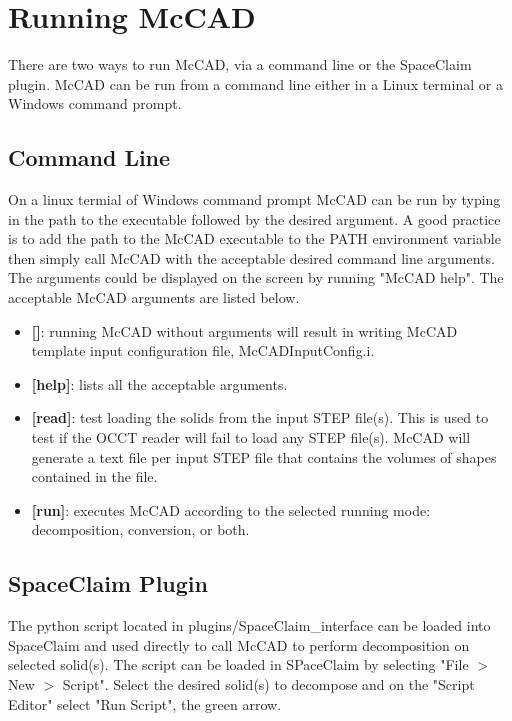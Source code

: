 \documentclass[letterpaper, 12 pt]{report}
\begin{document}
\section{Running McCAD} \label{sec:Running McCAD}
There are two ways to run McCAD, via a command line or the SpaceClaim plugin. McCAD can be run from a command line either in a Linux terminal or a Windows command prompt.

  \subsection{Command Line}
    On a linux termial of Windows command prompt McCAD can be run by typing in the path to the executable followed by the desired argument. A good practice is to add the path to the McCAD executable to the PATH environment variable then simply call McCAD with the acceptable desired command line arguments. The arguments could be displayed on the screen by running "McCAD help". The acceptable McCAD arguments are listed below.
    \begin{itemize}
      \item \textbf{[]}: running McCAD without arguments will result in writing McCAD template input configuration file, McCADInputConfig.i.
      \item \textbf{[help]}: lists all the acceptable arguments.
      \item \textbf{[read]}: test loading the solids from the input STEP file(s). This is used to test if the OCCT reader will fail to load any STEP file(s). McCAD will generate a text file per input STEP file that contains the volumes of shapes contained in the file.
      \item \textbf{[run]}: executes McCAD according to the selected running mode: decomposition, conversion, or both. 
    \end{itemize}

  \subsection{SpaceClaim Plugin}
    The python script located in plugins/SpaceClaim\_interface can be loaded into SpaceClaim and used directly to call McCAD to perform decomposition on selected solid(s).  The script can be loaded in SPaceClaim by selecting "File $>$ New $>$ Script". Select the desired solid(s) to decompose and on the "Script Editor" select "Run Script", the green arrow.
\end{document}
